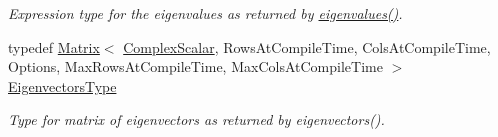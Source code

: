 \begin{DoxyCompactItemize}
\begin{DoxyCompactList}\small\item\em Expression type for the eigenvalues as returned by \mbox{\hyperlink{class_eigen_1_1_generalized_eigen_solver_a62f01cd78271efd5e39bcb24e0fe1a58}{eigenvalues()}}. \end{DoxyCompactList}\item 
typedef \mbox{\hyperlink{class_eigen_1_1_matrix}{Matrix}}$<$ \mbox{\hyperlink{class_eigen_1_1_generalized_eigen_solver_abdec07af91db1345bb4c74066e3d0ea7}{Complex\+Scalar}}, Rows\+At\+Compile\+Time, Cols\+At\+Compile\+Time, Options, Max\+Rows\+At\+Compile\+Time, Max\+Cols\+At\+Compile\+Time $>$ \mbox{\hyperlink{class_eigen_1_1_generalized_eigen_solver_afffec018dbb2d87b4c09b6acecbb79cd}{Eigenvectors\+Type}}
\begin{DoxyCompactList}\small\item\em Type for matrix of eigenvectors as returned by eigenvectors(). \end{DoxyCompactList}\end{DoxyCompactItemize}
